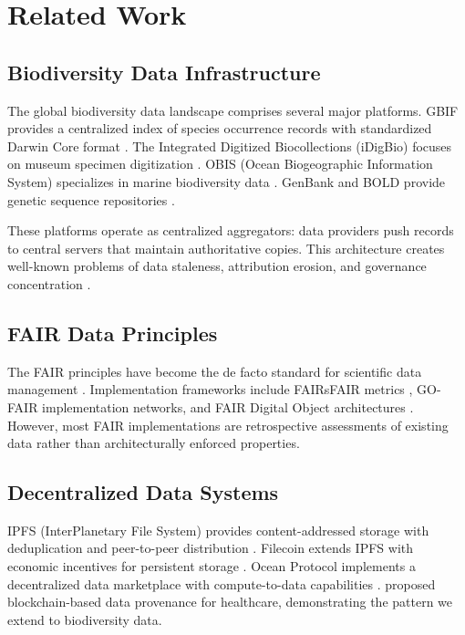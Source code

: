 \documentclass[11pt,a4paper]{article}
\begin{document}
\section{Related Work}
\label{sec:related}

\subsection{Biodiversity Data Infrastructure}

The global biodiversity data landscape comprises several major platforms.
GBIF provides a centralized index of species occurrence records with standardized Darwin Core format \citep{wieczorek2012darwin}.
The Integrated Digitized Biocollections (iDigBio) focuses on museum specimen digitization \citep{nelson2019digitization}.
OBIS (Ocean Biogeographic Information System) specializes in marine biodiversity data \citep{grassle2000ocean}.
GenBank and BOLD provide genetic sequence repositories \citep{benson2018genbank}.

These platforms operate as centralized aggregators: data providers push records to central servers that maintain authoritative copies.
This architecture creates well-known problems of data staleness, attribution erosion, and governance concentration \citep{arinoetal2013}.

\subsection{FAIR Data Principles}

The FAIR principles have become the de facto standard for scientific data management \citep{wilkinson2016fair}.
Implementation frameworks include FAIRsFAIR metrics \citep{devaraju2021fairsfair}, GO-FAIR implementation networks, and FAIR Digital Object architectures \citep{schultes2019fair}.
However, most FAIR implementations are retrospective assessments of existing data rather than architecturally enforced properties.

\subsection{Decentralized Data Systems}

IPFS (InterPlanetary File System) provides content-addressed storage with deduplication and peer-to-peer distribution \citep{benet2014ipfs}.
Filecoin extends IPFS with economic incentives for persistent storage \citep{protocol2017filecoin}.
Ocean Protocol implements a decentralized data marketplace with compute-to-data capabilities \citep{mcconaghy2020ocean}.
\citet{ramachandran2018trinity} proposed blockchain-based data provenance for healthcare, demonstrating the pattern we extend to biodiversity data.
\end{document}
